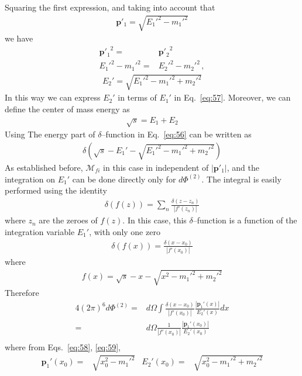 Squaring the first expression, and taking into account that
\begin{align}
  \label{eq:58}
  {\mathbf{p}'_1}= \sqrt{{E_1'}^2-{m_1'}^2}
\end{align}
we have
\begin{align}
  {\mathbf{p}'_1}^2=&{\mathbf{p}'_2}^2\nonumber\\
  {E_1'}^2-{m_1'}^2=&  {E_2'}^2-{m_2'}^2\,,
\end{align}
\begin{align}
\label{eq:59}
  E_2'=\sqrt{{E_1'}^2-{m_1'}^2+{m_2'}^2}
\end{align}
In this way we can express $E_2'$ in terms of $E_1'$ in Eq.~\eqref{eq:57}.
Moreover, we can define the center of mass energy as
\begin{align}
  \label{eq:60}
  \sqrt{s}=E_1+E_2
\end{align}
Using The energy part of $\delta$--function in Eq.~\eqref{eq:56} can be written as
\begin{align}
  \delta\left(\sqrt{s}-E_1'-\sqrt{{E_1'}^2-{m_1'}^2+{m_2'}^2}\right)
\end{align}
As established before,  $\mathcal{M}_{fi}$ in this case in independent of $|\mathbf{p}'_1|$, and the integration on $E_1'$ can be done directly only for $d\Phi^{(2)}$.
The integral is easily performed using the identity
\begin{align}
  \delta\left(f(z)\right)=\sum_n\frac{\delta(z-z_n)}{|f'(z_n)|}
\end{align}
where $z_n$ are the zeroes of $f(z)$. In this case, this $\delta$--function is a function of the integration variable $E_1'$, with only one zero
\begin{align}
   \delta\left(f(x)\right)=\frac{\delta(x-x_0)}{|f'(x_0)|}
\end{align}
where
\begin{align}
  f(x)=\sqrt{s}-x-\sqrt{x^2-{m_1'}^2+{m_2'}^2}
\end{align}
Therefore
\begin{align}
  \label{eq:61}
   4(2\pi)^6d\Phi^{(2)}=&d\Omega\int\frac{\delta(x-x_0)}{|f'(x_0)|}\frac{
     |\mathbf{p}_1'(x)|}{E_2'(x)}dx\nonumber\\
   =&d\Omega\frac{1}{|f'(x_0)|}\frac{
     |\mathbf{p}_1'(x_0)|}{E_2'(x_0)}\nonumber\\
\end{align}
where from Eqs.~\eqref{eq:58}, \eqref{eq:59},
\begin{align}
  \label{eq:62}
  \mathbf{p}_1'(x_0)=&\sqrt{x_0^2-{m_1'}^2}&
  E_2'(x_0)=&\sqrt{x_0^2-{m_1'}^2+{m_2'}^2}
\end{align}
